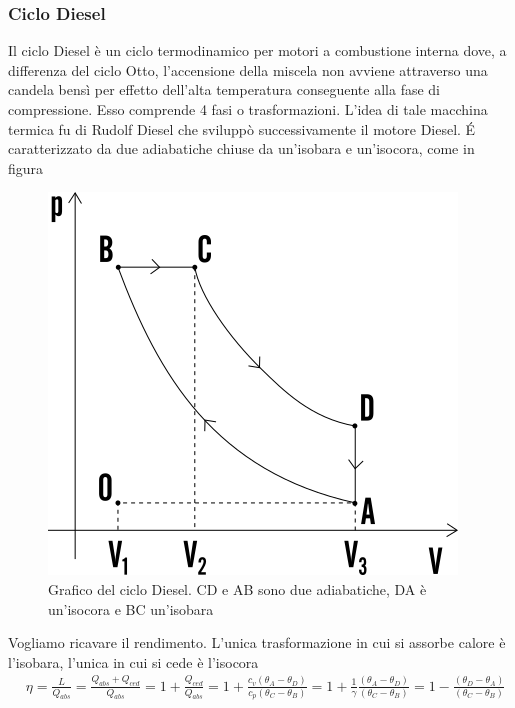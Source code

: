 \documentclass[10pt,a4paper]{article}
\begin{document}
\subsubsection{Ciclo Diesel}
Il ciclo Diesel è un ciclo termodinamico per motori a combustione interna dove, a differenza del ciclo Otto, l'accensione della miscela non avviene attraverso una candela bensì per effetto dell'alta temperatura conseguente alla fase di compressione. Esso comprende 4 fasi o trasformazioni. L'idea di tale macchina termica fu di Rudolf Diesel che sviluppò successivamente il motore Diesel. \'{E} caratterizzato da due adiabatiche chiuse da un'isobara e un'isocora, come in figura
\begin{figure}[h!]
	\centering
	\includegraphics[width=0.4\linewidth]{../images/ciclo-diesel}
	\caption{Grafico del ciclo Diesel. CD e AB sono due adiabatiche, DA è un'isocora e BC un'isobara}
	\label{fig:ciclo-diesel}
\end{figure}
\FloatBarrier
Vogliamo ricavare il rendimento. L'unica trasformazione in cui si assorbe calore è l'isobara, l'unica in cui si cede è l'isocora
\begin{align*}
	&\eta = \frac{L}{Q_{abs}} = \frac{Q_{abs}+Q_{ced}}{Q_{abs}} = 1 +\frac{Q_{ced}}{Q_{abs}} = 1 + \frac{c_v(\theta_A-\theta_D)}{c_p(\theta_C-\theta_B)} = 1+\frac{1}{\gamma}\frac{(\theta_A-\theta_D)}{(\theta_C-\theta_B)} = 1 - \frac{(\theta_D-\theta_A)}{(\theta_C-\theta_B)}
\end{align*}
\end{document}

